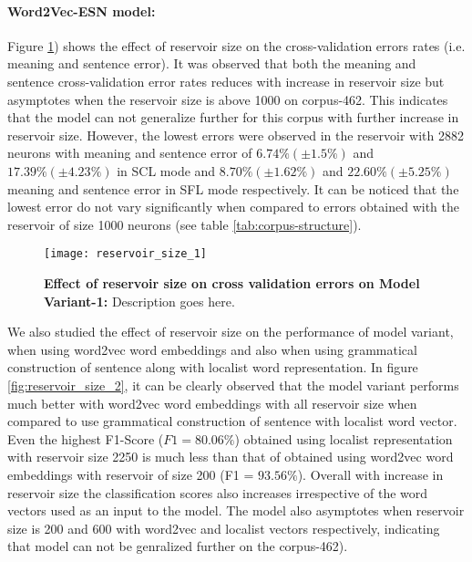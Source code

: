 {{\paragraph{Word2Vec-ESN model: } Figure \ref{fig:reservoir_size_1}) shows the effect of reservoir size on the cross-validation errors rates (i.e. meaning and sentence error). It was observed that both the meaning and sentence cross-validation error rates reduces with increase in reservoir size but asymptotes when the reservoir size is above 1000 on corpus-462. This indicates that the model can not generalize further for this corpus with further increase in reservoir size. However, the lowest errors were observed in the reservoir with 2882 neurons with meaning and sentence error of $6.74 \% (\pm 1.5\%)$ and $17.39\% (\pm 4.23 \%)$ in SCL mode and $8.70 \% (\pm 1.62\%)$ and $22.60\% (\pm 5.25 \%)$ meaning and sentence error in SFL mode respectively. It can be noticed that the lowest error do not vary significantly when compared to errors obtained with the reservoir of size 1000 neurons (see table \ref{tab:corpus-structure}).

\begin{figure}[hbtp]
\centering
\texttt{[image: reservoir\_size\_1]}
\caption[Effect of reservoir size on Word2Vec-ESNM model]{\textbf{Effect of reservoir size on cross validation errors on Model Variant-1:} Description goes here.}
\label{fig:reservoir_size_1}
\end{figure}

We also studied the effect of reservoir size on the performance of model variant, when using word2vec word embeddings and also when using grammatical construction of sentence along with localist word representation. In figure \ref{fig:reservoir_size_2}, it can be clearly observed that the model variant performs much better with word2vec word embeddings with all reservoir size when compared to use grammatical construction of sentence with localist word vector. Even the highest F1-Score ($F1 = 80.06 \%$) obtained using localist representation with reservoir size 2250 is much less than that of obtained using word2vec word embeddings with reservoir of size 200 (F1 = $ 93.56\%$). Overall with increase in reservoir size the classification scores also increases irrespective of the word vectors used as an input to the model. The model also asymptotes when reservoir size is 200 and 600 with word2vec and localist vectors respectively, indicating that model can not be genralized further on the corpus-462). 

}}
